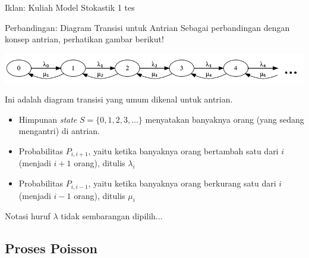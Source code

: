 \documentclass{beamer}
\begin{document}
\begin{frame}{Iklan: Kuliah Model Stokastik 1}
    tes
\end{frame}

\begin{frame}{Perbandingan: Diagram Transisi untuk Antrian}
    Sebagai perbandingan dengan konsep antrian, perhatikan gambar berikut!

    \includegraphics[scale=0.5]{gambar/diagram_transisi_antrian.png}

    Ini adalah diagram transisi yang umum dikenal untuk antrian.
    \begin{itemize}
        \item Himpunan \textit{state} \( S = \{ 0, 1, 2, 3, \dots \} \) menyatakan banyaknya orang (yang sedang mengantri) di antrian.
        \item Probabilitas \( P_{i,i+1} \), yaitu ketika banyaknya orang bertambah satu dari \( i \) (menjadi \( i+1 \) orang), ditulis \( \lambda_i \)
        \item Probabilitas \( P_{i,i-1} \), yaitu ketika banyaknya orang berkurang satu dari \( i \) (menjadi \( i-1 \) orang), ditulis \( \mu_i \)
    \end{itemize}
    Notasi huruf \( \lambda \) tidak sembarangan dipilih...
\end{frame}

\subsection{Proses Poisson}
\end{document}
